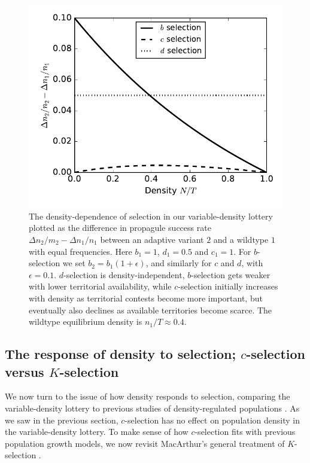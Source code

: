 \documentclass[12pt]{article}
\begin{document}
\begin{figure}
\centering
\includegraphics[scale=0.8]{DDS_lottery.pdf}
\caption{\label{fig:DDS_lottery} The density-dependence of selection in our variable-density lottery plotted as the difference in propagule success rate $\Delta n_2/m_2-\Delta n_1/n_1$ between an adaptive variant $2$ and a wildtype $1$ with equal frequencies. Here $b_1=1$, $d_1=0.5$ and $c_1=1$. For $b$-selection we set $b_2=b_1(1+\epsilon)$, and similarly for $c$ and $d$, with $\epsilon=0.1$. $d$-selection is density-independent, $b$-selection gets weaker with lower territorial availability, while $c$-selection initially increases with density as territorial contests become more important, but eventually also declines as  available territories become scarce. The wildtype equilibrium density is $n_1/T\approx 0.4$.}
\end{figure}

\subsection*{The response of density to selection; $c$-selection versus $K$-selection}

We now turn to the issue of how density responds to selection, comparing the variable-density lottery to previous studies of density-regulated populations \citep{prout_1980}. As we saw in the previous section, $c$-selection has no effect on population density in the variable-density lottery. To make sense of how $c$-selection fits with previous population growth models, we now revisit MacArthur's general treatment of $K$-selection \citep{macarthur_1967}.
\end{document}
